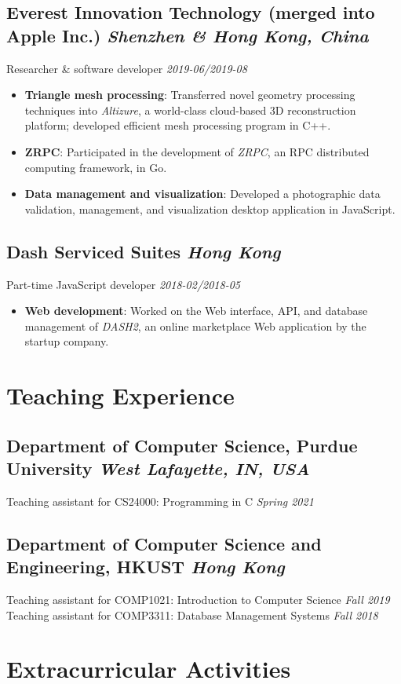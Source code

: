 \documentclass[11pt]{article}
\newcommand{\subsec}[2]{\subsection*{#1 \hfill {\normalfont\itshape #2}}}
\newcommand{\subsecdesc}[2]{{#1 \hfill \itshape #2}}
\begin{document}
  \subsec{Everest Innovation Technology \small{(merged into Apple Inc.)}}
         {Shenzhen \& Hong Kong, China}
  \subsecdesc{Researcher \& software developer}
             {2019-06/2019-08}
  \begin{itemize}
    \item \textbf{Triangle mesh processing}: Transferred novel geometry
      processing techniques into \emph{Altizure}, a world-class cloud-based 3D
      reconstruction platform; developed efficient mesh processing program in
      C++.
    \item \textbf{ZRPC}: Participated in the development of \emph{ZRPC}, an RPC
      distributed computing framework, in Go.
    \item \textbf{Data management and visualization}: Developed a photographic
      data validation, management, and visualization desktop application in
      JavaScript.
  \end{itemize}

\ifdefined{}
  \subsec{Dash Serviced Suites}
         {Hong Kong}
  \subsecdesc{Part-time JavaScript developer}
             {2018-02/2018-05}
  \begin{itemize}
    \item \textbf{Web development}: Worked on the Web interface, API, and
      database management of \emph{DASH2}, an online marketplace Web application
      by the startup company.
  \end{itemize}
\fi

\section*{Teaching Experience} %

  \subsec{Department of Computer Science, Purdue University}
         {West Lafayette, IN, USA}
  \subsecdesc{Teaching assistant for CS24000: Programming in C}
             {Spring 2021}
  \subsec{Department of Computer Science and Engineering, HKUST}
         {Hong Kong}
  \subsecdesc{Teaching assistant for COMP1021: Introduction to Computer Science}
             {Fall 2019} \\
  \subsecdesc{Teaching assistant for COMP3311: Database Management Systems}
             {Fall 2018}

\ifdefined{}
\section*{Extracurricular Activities} %
\end{document}
